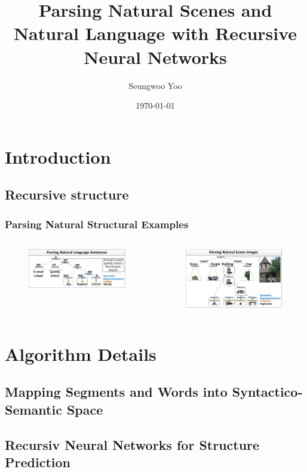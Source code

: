 \documentclass{beamer}
\title{Parsing Natural Scenes and Natural Language with Recursive Neural Networks}
\author{Seungwoo Yoo}
\date{\today}
\begin{document}
\frame{\titlepage}

\section[Outline]{}
\frame{\tableofcontents}

\section{Introduction}
\subsection{Recursive structure}
\frame
{
  \frametitle{Parsing Natural Structural Examples}
  \begin{columns}
  \begin{figure}[ht]  
	  \begin{center}
		  \includegraphics[width=2.1in]{images/fig1.png}   
	  \end{center}   
  \end{figure}
  \begin{figure}[ht]
	  \begin{center}
		  \includegraphics[width=2.1in]{images/fig2.png} 
	  \end{center}
  \end{figure}
  \end{columns}
}
\section{Algorithm Details}
\subsection{Mapping Segments and Words into Syntactico-Semantic Space}
\frame
{
}
\subsection{Recursiv Neural Networks for Structure Prediction}
\frame
{
}
\end{document}
